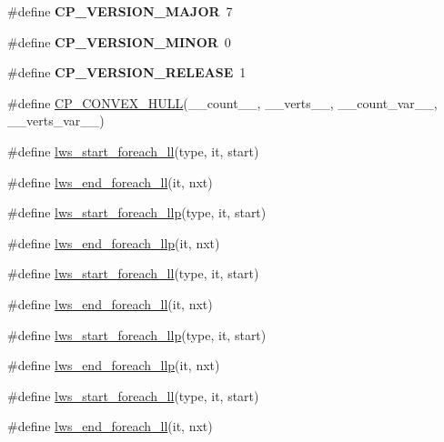 \begin{DoxyCompactItemize}
\mbox{\label{group__misc_gac02132b57a51a1c26ff6fb11dc046c04}} 
\#define {\bfseries C\+P\+\_\+\+V\+E\+R\+S\+I\+O\+N\+\_\+\+M\+A\+J\+OR}~7
\item 
\mbox{\label{group__misc_ga015d989acd6a013e84ea8696953172a8}} 
\#define {\bfseries C\+P\+\_\+\+V\+E\+R\+S\+I\+O\+N\+\_\+\+M\+I\+N\+OR}~0
\item 
\mbox{\label{group__misc_ga0311c28764c81d74c3c76570bb92c57f}} 
\#define {\bfseries C\+P\+\_\+\+V\+E\+R\+S\+I\+O\+N\+\_\+\+R\+E\+L\+E\+A\+SE}~1
\item 
\#define \hyperlink{group__misc_ga9abe29a1fe6d1f2041e95f2fb2e2ce1c}{C\+P\+\_\+\+C\+O\+N\+V\+E\+X\+\_\+\+H\+U\+LL}(\+\_\+\+\_\+count\+\_\+\+\_\+,  \+\_\+\+\_\+verts\+\_\+\+\_\+,  \+\_\+\+\_\+count\+\_\+var\+\_\+\+\_\+,  \+\_\+\+\_\+verts\+\_\+var\+\_\+\+\_\+)
\item 
\#define \hyperlink{group__misc_ga9f138b98c73782807d88e76c1c532dc2}{lws\+\_\+start\+\_\+foreach\+\_\+ll}(type,  it,  start)
\item 
\#define \hyperlink{group__misc_ga9d94995ca7a1be16bf3d7bd2e449c812}{lws\+\_\+end\+\_\+foreach\+\_\+ll}(it,  nxt)
\item 
\#define \hyperlink{group__misc_gad973ecfe2ac066ba0ea1ec3695d3e896}{lws\+\_\+start\+\_\+foreach\+\_\+llp}(type,  it,  start)
\item 
\#define \hyperlink{group__misc_gaba92c53b57f3e689f8568b02184a8d84}{lws\+\_\+end\+\_\+foreach\+\_\+llp}(it,  nxt)
\item 
\#define \hyperlink{group__misc_ga9f138b98c73782807d88e76c1c532dc2}{lws\+\_\+start\+\_\+foreach\+\_\+ll}(type,  it,  start)
\item 
\#define \hyperlink{group__misc_ga9d94995ca7a1be16bf3d7bd2e449c812}{lws\+\_\+end\+\_\+foreach\+\_\+ll}(it,  nxt)
\item 
\#define \hyperlink{group__misc_gad973ecfe2ac066ba0ea1ec3695d3e896}{lws\+\_\+start\+\_\+foreach\+\_\+llp}(type,  it,  start)
\item 
\#define \hyperlink{group__misc_gaba92c53b57f3e689f8568b02184a8d84}{lws\+\_\+end\+\_\+foreach\+\_\+llp}(it,  nxt)
\item 
\#define \hyperlink{group__misc_ga9f138b98c73782807d88e76c1c532dc2}{lws\+\_\+start\+\_\+foreach\+\_\+ll}(type,  it,  start)
\item 
\#define \hyperlink{group__misc_ga9d94995ca7a1be16bf3d7bd2e449c812}{lws\+\_\+end\+\_\+foreach\+\_\+ll}(it,  nxt)

\end{DoxyCompactItemize}
